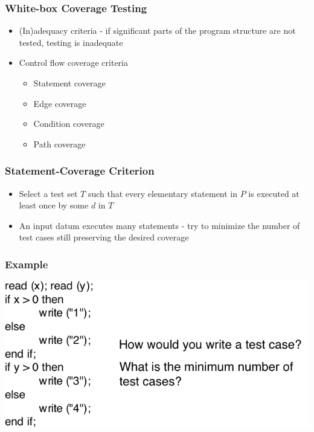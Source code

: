 \documentclass[t,12pt,numbers,fleqn]{beamer}
\begin{document}

\begin{frame}
\frametitle{White-box Coverage Testing}

\begin{itemize}
\item (In)adequacy criteria - if significant parts of the program structure are not tested, testing is inadequate
\item Control flow coverage criteria
\begin{itemize}
\item Statement coverage
\item Edge coverage
\item Condition coverage
\item Path coverage
\end{itemize}
\end{itemize}

\end{frame}


\begin{frame}
\frametitle{Statement-Coverage Criterion}

\begin{itemize}
\item Select a test set $T$ such that every elementary statement in $P$ is
  executed at least once by some $d$ in $T$
\item An input datum executes many statements - try to minimize the number of
  test cases still preserving the desired coverage
\end{itemize}

\end{frame}


\begin{frame}
\frametitle{Example}

\includegraphics[scale=0.5]{../Figures/ExampleStatementCoverageOnlyCode.png}

\end{frame}
\end{document}
